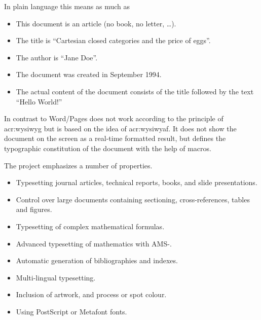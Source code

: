 In plain language this means as much as
\begin{itemize}
	\item This document is an article (no book, no letter, \ldots).
	\item The title is \enquote{Cartesian closed categories and the price of eggs}.
	\item The author is \enquote{Jane Doe}.
	\item The document was created in September 1994.
	\item The actual content of the document consists of the title followed by the text \enquote{Hello World!}
\end{itemize}

In contrast to Word/Pages \Latex does not work according to the principle of \ac{acr:wysiwyg} but is based on the idea of \ac{acr:wysiwyaf}. It does not show the document on the screen as a real-time formatted result, but defines the typographic constitution of the document with the help of macros.

The \Latex project emphasizes a number of properties.
\begin{itemize}
	\item Typesetting journal articles, technical reports, books, and slide presentations.
	\item Control over large documents containing sectioning, cross-references, tables and figures.
	\item Typesetting of complex mathematical formulas.
	\item Advanced typesetting of mathematics with AMS-\Latex.
	\item Automatic generation of bibliographies and indexes.
	\item Multi-lingual typesetting.
	\item Inclusion of artwork, and process or spot colour.
	\item Using PostScript or Metafont fonts.
\end{itemize}